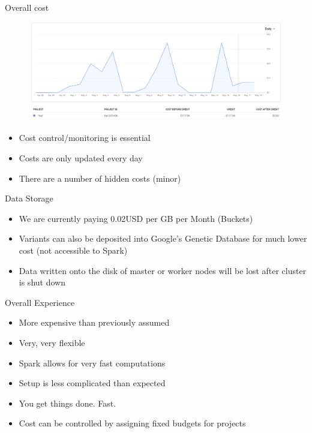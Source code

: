 \documentclass{beamer}
\begin{document}
\begin{frame}{Overall cost}
  \begin{figure}[htpb]
    \centering
    \includegraphics[width=0.9\linewidth]{figure/cash_burn.png}
  \end{figure}
  \begin{itemize}
    \item Cost control/monitoring is essential
    \item Costs are only updated every day
    \item There are a number of hidden costs (minor)
  \end{itemize}
\end{frame}

\begin{frame}[t]{Data Storage}
  \begin{itemize}
    \item We are currently paying 0.02USD per GB per Month (Buckets)
    \item Variants can also be deposited into Google's Genetic Database for much lower cost (not accessible to Spark)
    \item Data written onto the disk of master or worker nodes will be lost after cluster is shut down
  \end{itemize}
\end{frame}

\begin{frame}[t]{Overall Experience}
  \begin{itemize}
    \item More expensive than previously assumed
    \item Very, very flexible
    \item Spark allows for very fast computations
    \item Setup is less complicated than expected
    \item You get things done. Fast.
    \item Cost can be controlled by assigning fixed budgets for projects
  \end{itemize}
\end{frame}
\end{document}
